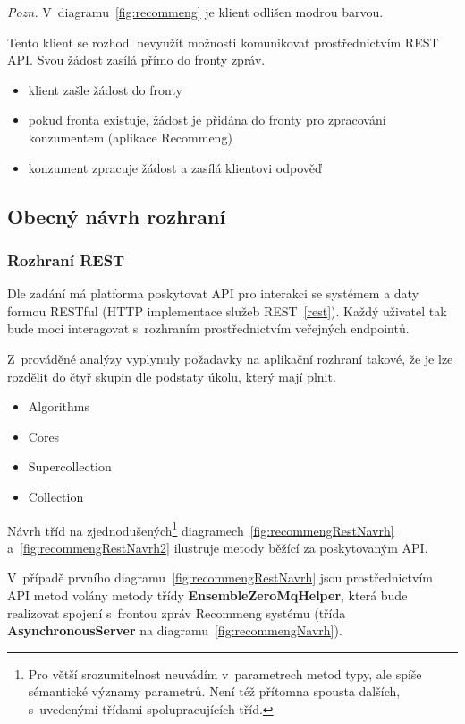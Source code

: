 \documentclass[thesis=M,czech]{FITthesis}[2014/05/07]
\begin{document}
\emph{Pozn.} V~diagramu~\ref{fig:recommeng} je klient odlišen modrou barvou.

Tento klient se rozhodl nevyužít možnosti komunikovat prostřednictvím REST API. Svou žádost zasílá přímo do fronty zpráv.

\begin{itemize}
	\item klient zašle žádost do fronty
	\item pokud fronta existuje, žádost je přidána do fronty pro zpracování konzumentem (aplikace Recommeng)
	\item konzument zpracuje žádost a zasílá klientovi odpověď
\end{itemize}

\subsection{Obecný návrh rozhraní}
\label{sec:recommeng}

\subsubsection{Rozhraní REST}
Dle zadání má platforma poskytovat API pro interakci se systémem a daty formou RESTful (HTTP implementace služeb REST~\ref{rest}). Každý uživatel tak bude moci interagovat s~rozhraním prostřednictvím veřejných endpointů.

Z~prováděné analýzy vyplynuly požadavky na aplikační rozhraní takové, že je lze rozdělit do čtyř skupin dle podstaty úkolu, který mají plnit. 

\begin{itemize}
	\item Algorithms
	\item Cores
	\item Supercollection
	\item Collection	
\end{itemize}

Návrh tříd na zjednodušených\footnote{Pro větší srozumitelnost neuvádím v~parametrech metod typy, ale spíše sémantické významy parametrů. Není též přítomna spousta dalších, s~uvedenými třídami spolupracujících tříd.} diagramech~\ref{fig:recommengRestNavrh} a~\ref{fig:recommengRestNavrh2} ilustruje metody běžící za poskytovaným API.

V~případě prvního diagramu~\ref{fig:recommengRestNavrh} jsou prostřednictvím API metod volány metody třídy \textbf{EnsembleZeroMqHelper}, která bude realizovat spojení s~frontou zpráv Recommeng systému (třída \textbf{AsynchronousServer} na diagramu~\ref{fig:recommengNavrh}).
\end{document}

